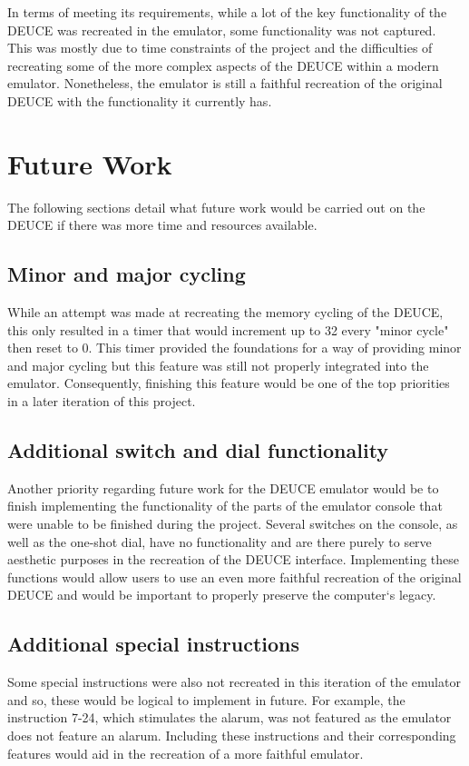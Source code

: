 \documentclass{l4proj}
\begin{document}
In terms of meeting its requirements, while a lot of the key functionality of the DEUCE was recreated in the emulator, some functionality was not captured. This was mostly due to time constraints of the project and the difficulties of recreating some of the more complex aspects of the DEUCE within a modern emulator. Nonetheless, the emulator is still a faithful recreation of the original DEUCE with the functionality it currently has.

\section{Future Work}
The following sections detail what future work would be carried out on the DEUCE if there was more time and resources available.

\subsection{Minor and major cycling}
While an attempt was made at recreating the memory cycling of the DEUCE, this only resulted in a timer that would increment up to 32 every "minor cycle" then reset to 0. This timer provided the foundations for a way of providing minor and major cycling but this feature was still not properly integrated into the emulator. Consequently, finishing this feature would be one of the top priorities in a later iteration of this project.

\subsection{Additional switch and dial functionality}
Another priority regarding future work for the DEUCE emulator would be to finish implementing the functionality of the parts of the emulator console that were unable to be finished during the project. Several switches on the console, as well as the one-shot dial, have no functionality and are there purely to serve aesthetic purposes in the recreation of the DEUCE interface. Implementing these functions would allow users to use an even more faithful recreation of the original DEUCE and would be important to properly preserve the computer`s legacy.

\subsection{Additional special instructions}
Some special instructions were also not recreated in this iteration of the emulator and so, these would be logical to implement in future. For example, the instruction 7-24, which stimulates the alarum, was not featured as the emulator does not feature an alarum. Including these instructions and their corresponding features would aid in the recreation of a more faithful emulator.
\end{document}
